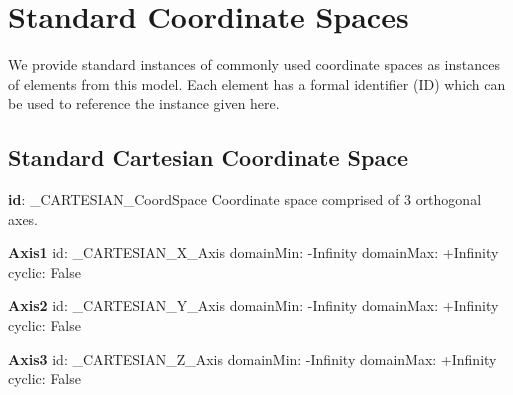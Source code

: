 \pagebreak
\section{Standard Coordinate Spaces}
\label{sect:StdCoordSpaces}
We provide standard instances of commonly used coordinate spaces as instances of elements from this model.  Each element has a formal identifier (ID) which can be used to reference the instance given here.

  \subsection{Standard Cartesian Coordinate Space}
  \label{sect:Cartesian}

  \begin{minipage}{0.5\textwidth}
    \small
    \textbf{id}: \_CARTESIAN\_CoordSpace \newline
    Coordinate space comprised of 3 orthogonal axes.
    
    \noindent \textbf{Axis1} \newline
    \indent id:  \_CARTESIAN\_X\_Axis \newline
    \indent domainMin:  -Infinity \newline
    \indent domainMax:  +Infinity \newline
    \indent cyclic:  False \newline
    
    \noindent \textbf{Axis2} \newline
    \indent id:  \_CARTESIAN\_Y\_Axis \newline
    \indent domainMin:  -Infinity \newline
    \indent domainMax:  +Infinity \newline
    \indent cyclic:  False \newline
    
    \noindent \textbf{Axis3} \newline
    \indent id:  \_CARTESIAN\_Z\_Axis \newline
    \indent domainMin:  -Infinity \newline
    \indent domainMax:  +Infinity \newline
    \indent cyclic:  False \newline
    \normalsize
  \end{minipage}
